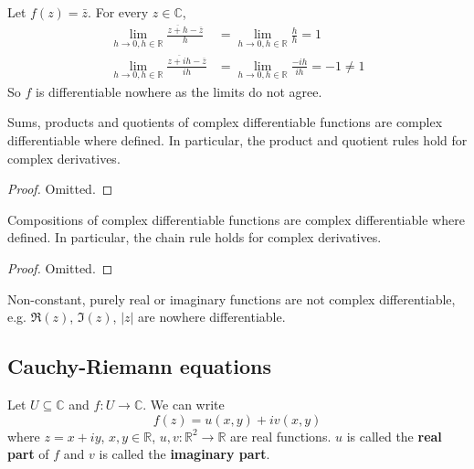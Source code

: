 \begin{example}
	Let $f(z) = \bar{z}$. For every $z \in \mathbb{C}$,
	\[
		\begin{aligned}
			\lim_{h \to 0, h \in \mathbb{R}} \frac{\overline{z + h} - \overline{z}}{h} & = \lim_{h \to 0, h \in \mathbb{R}} \frac{h}{h} = 1 \\
			\lim_{h \to 0, h \in \mathbb{R}} \frac{\overline{z + ih} - \overline{z}}{ih} & = \lim_{h \to 0, h \in \mathbb{R}} \frac{-ih}{ih} = -1 \ne 1
		\end{aligned}
	\]
	So $f$ is differentiable nowhere as the limits do not agree.
\end{example}

\begin{proposition}
	Sums, products and quotients of complex differentiable functions are complex differentiable where defined. In particular, the product and quotient rules hold for complex derivatives.
\end{proposition}

\begin{proof}
	Omitted.
\end{proof}

\begin{proposition}\label{prop:chainRule}
	Compositions of complex differentiable functions are complex differentiable where defined. In particular, the chain rule holds for complex derivatives.
\end{proposition}

\begin{proof}
	Omitted.
\end{proof}

\begin{example}
	Non-constant, purely real or imaginary functions are not complex differentiable, e.g. $\Re(z)$, $\Im(z)$, $|z|$ are nowhere differentiable.
\end{example}

\subsection{Cauchy-Riemann equations}

\begin{definition}
	Let $U \subseteq \mathbb{C}$ and $f: U \rightarrow \mathbb{C}$. We can write
	\[
		f(z) = u(x, y) + i v(x, y)
	\]
	where $z = x + iy$, $x, y \in \mathbb{R}$, $u, v: \mathbb{R}^2 \to \mathbb{R}$ are real functions. $u$ is called the \textbf{real part} of $f$ and $v$ is called the \textbf{imaginary part}.
\end{definition}

